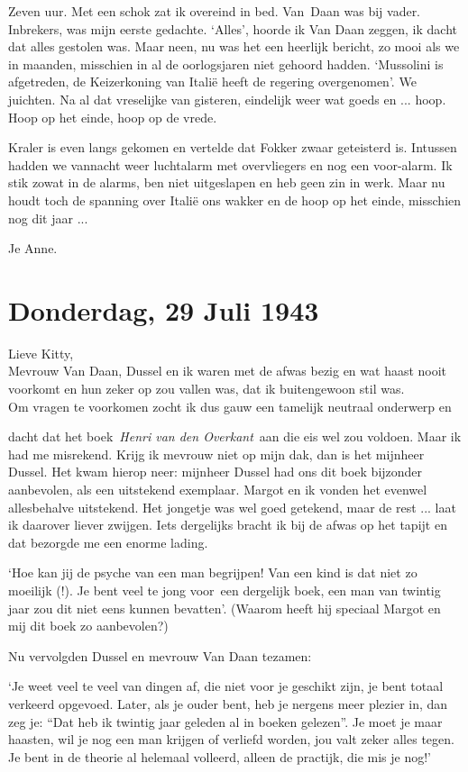 \documentclass{book}
\begin{document}
Zeven uur. Met een schok zat ik overeind in bed. Van~Daan was bij vader.
Inbrekers, was mijn eerste gedachte. `Alles', hoorde ik Van Daan zeggen, ik
dacht dat alles gestolen was. Maar neen, nu was het een heerlijk bericht, zo
mooi als we in maanden, misschien in al de oorlogsjaren niet gehoord hadden.
`Mussolini is afgetreden, de Keizerkoning van Italië heeft de regering
overgenomen'. We juichten. Na al dat vreselijke van gisteren, eindelijk weer wat
goeds en ... hoop. Hoop op het einde, hoop op de vrede.

Kraler is even langs gekomen en vertelde dat Fokker zwaar geteisterd is.
Intussen hadden we vannacht weer luchtalarm met overvliegers en nog een
voor-alarm. Ik stik zowat in de alarms, ben niet uitgeslapen en heb geen zin in
werk. Maar nu houdt toch de spanning over Italië ons wakker en de hoop op het
einde, misschien nog dit jaar ...

Je Anne.

\section*{Donderdag, 29 Juli 1943}

Lieve Kitty,\\
Mevrouw Van Daan, Dussel en ik waren met de afwas bezig en wat
haast nooit voorkomt en hun zeker op zou vallen was, dat ik buitengewoon stil
was.\\
Om vragen te voorkomen zocht ik dus gauw een tamelijk neutraal onderwerp
en

dacht dat het boek~\emph{Henri van den Overkant}~aan die eis wel zou voldoen.
Maar ik had me misrekend. Krijg ik mevrouw niet op mijn dak, dan is het mijnheer
Dussel. Het kwam hierop neer: mijnheer Dussel had ons dit boek bijzonder
aanbevolen, als een uitstekend exemplaar. Margot en ik vonden het evenwel
allesbehalve uitstekend. Het jongetje was wel goed getekend, maar de rest ...
laat ik daarover liever zwijgen. Iets dergelijks bracht ik bij de afwas op het
tapijt en dat bezorgde me een enorme lading.

`Hoe kan jij de psyche van een man begrijpen! Van een kind is dat niet zo
moeilijk (!). Je bent veel te jong voor~een dergelijk boek, een man van twintig
jaar zou dit niet eens kunnen bevatten'. (Waarom heeft hij speciaal Margot en
mij dit boek zo aanbevolen?)

Nu vervolgden Dussel en mevrouw Van Daan tezamen:

`Je weet veel te veel van dingen af, die niet voor je geschikt zijn, je bent
totaal verkeerd opgevoed. Later, als je ouder bent, heb je nergens meer plezier
in, dan zeg je: ``Dat heb ik twintig jaar geleden al in boeken gelezen''. Je
moet je maar haasten, wil je nog een man krijgen of verliefd worden, jou valt
zeker alles tegen. Je bent in de theorie al helemaal volleerd, alleen de
practijk, die mis je nog!'
\end{document}
